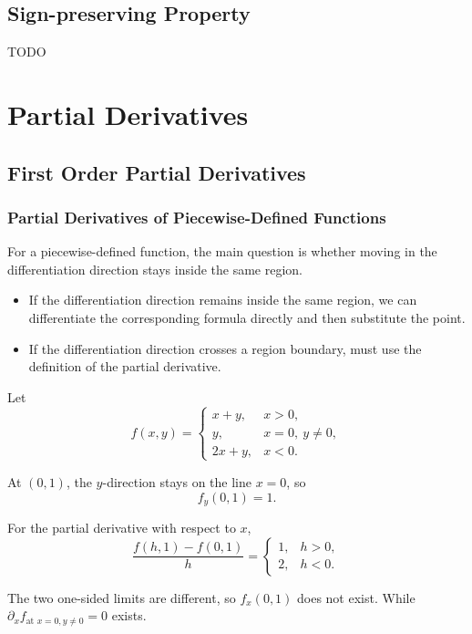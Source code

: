 \documentclass[a4]{overview}
\begin{document}
\subsection{Sign-preserving Property}

TODO

\section{Partial Derivatives}

\subsection{First Order Partial Derivatives}

\subsubsection{Partial Derivatives of Piecewise-Defined Functions}

For a piecewise-defined function, the main question is whether moving in the
differentiation direction stays inside the same region.

\begin{itemize}
    \item If the differentiation direction remains inside the same region, 
			we can differentiate the corresponding formula directly and then substitute the point.
    \item If the differentiation direction crosses a region boundary, 
			must use the definition of the partial derivative.
\end{itemize}

\begin{example}
Let
\[
f(x,y)=
\begin{cases}
x+y, & x>0,\\
y, & x=0,\ y\neq 0,\\
2x+y, & x<0.
\end{cases}
\]

At $(0,1)$, the $y$-direction stays on the line $x=0$, so
\[
f_y(0,1)=1.
\]

For the partial derivative with respect to $x$,
\[
\frac{f(h,1)-f(0,1)}{h}
=
\begin{cases}
1, & h>0,\\
2, & h<0.
\end{cases}
\]

The two one-sided limits are different, so $ f_x(0,1) $ does not exist.
While $\partial_x f_{\text{at } x=0, y\neq 0} = 0$ exists.
\end{example}
\end{document}
